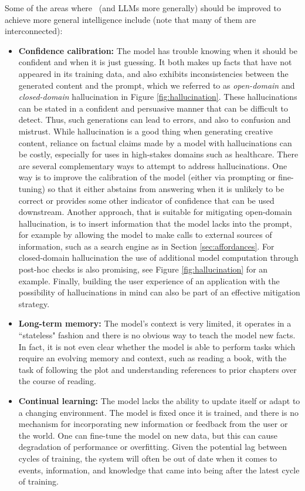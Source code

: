 Some of the areas where \DV\ (and LLMs more generally) should be improved to achieve more general intelligence include (note that many of them are interconnected):
\begin{itemize}
    \item \textbf{Confidence calibration:} The model has trouble knowing when it should be confident and when it is just guessing. It both makes up facts that have not appeared in its training data, and also exhibits inconsistencies between the generated content and the prompt, which we referred to as {\em open-domain} and {\em closed-domain} hallucination in Figure \ref{fig:hallucination}. These hallucinations can be stated in a confident and persuasive manner that can be difficult to detect. Thus, such generations can lead to errors, and also to confusion and mistrust. While hallucination is a good thing when generating creative content, reliance on factual claims made by a model with hallucinations can be costly, especially for uses in high-stakes domains such as healthcare. There are several complementary ways to attempt to address hallucinations. One way is to improve the calibration of the model (either via prompting or fine-tuning) so that it either abstains from answering when it is unlikely to be correct or provides some other indicator of confidence that can be used downstream. Another approach, that is suitable for mitigating open-domain hallucination, is to insert information that the model lacks into the prompt, for example by allowing the model to make calls to external sources of information, such as a search engine as in Section \ref{sec:affordances}. For closed-domain hallucination the use of additional model computation through post-hoc checks is also promising, see Figure \ref{fig:hallucination} for an example. Finally, building the user experience of an application with the possibility of hallucinations in mind can also be part of an effective mitigation strategy. %
    \item \textbf{Long-term memory:} The model's context is very limited, it operates in a ``stateless" fashion and there is no obvious way to teach the model new facts. In fact, it is not even clear whether the model is able to perform tasks which require an evolving memory and context, such as reading a book, with the task of following the plot and understanding references to prior chapters over the course of reading.
    \item \textbf{Continual learning:} The model lacks the ability to update itself or adapt to a changing environment. The model is fixed once it is trained, and there is no mechanism for incorporating new information or feedback from the user or the world. One can fine-tune the model on new data, but this can cause degradation of performance or overfitting. Given the potential lag between cycles of training, the system will often be out of date when it comes to events, information, and knowledge that came into being after the latest cycle of training.

\end{itemize}
